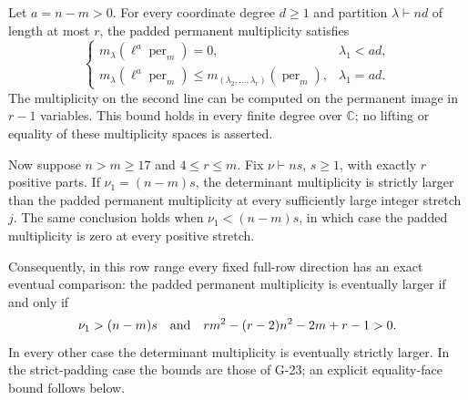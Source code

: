 \begin{theorem}\label{G-26}
Let $a=n-m>0$. For every coordinate degree $d\ge1$ and partition
$\lambda\vdash nd$ of length at most $r$, the padded permanent
multiplicity satisfies
\begin{equation}\label{G26:pieri_bound}
 \begin{cases}
 m_\lambda(\ell^a\operatorname{per}_m)=0,&\lambda_1<ad,\\[2pt]
 m_\lambda(\ell^a\operatorname{per}_m)
   \le m_{(\lambda_2,\ldots,\lambda_r)}(\operatorname{per}_m),
       &\lambda_1=ad.
 \end{cases}
\end{equation}
The multiplicity on the second line can be computed on the
permanent image in $r-1$ variables. This bound holds in every
finite degree over $\mathbb C$; no lifting or equality of these
multiplicity spaces is asserted.

Now suppose $n>m\ge17$ and $4\le r\le m$. Fix
$\nu\vdash ns$, $s\ge1$, with exactly $r$ positive parts.
If $\nu_1=(n-m)s$, the determinant multiplicity is strictly
larger than the padded permanent multiplicity at every
sufficiently large integer stretch $j$. The same conclusion
holds when $\nu_1<(n-m)s$, in which case the padded multiplicity
is zero at every positive stretch.

Consequently, in this row range every fixed full-row direction
has an exact eventual comparison: the padded permanent
multiplicity is eventually larger if and only if
\[
 \nu_1>(n-m)s
 \quad\hbox{and}\quad
 rm^2-(r-2)n^2-2m+r-1>0.
\]
In every other case the determinant multiplicity is eventually
strictly larger. In the strict-padding case the bounds are
those of G-23; an explicit equality-face bound follows below.
\end{theorem}

